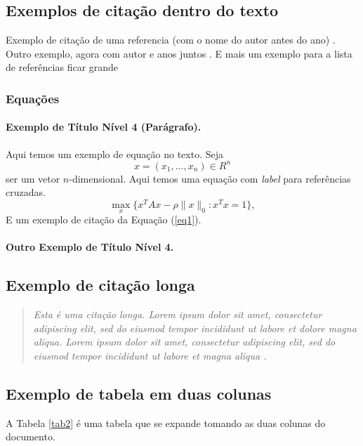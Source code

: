 \subsection{Exemplos de citação dentro do texto}
Exemplo de citação de uma referencia (com o nome do autor antes do ano) \cite{ref3}. Outro exemplo, agora com autor e anos juntos \citep{ref4}. E mais um exemplo para a lista de referências ficar grande \citep{ref2,ref3,ref4}


\subsubsection{Equações}
\paragraph{Exemplo de Título Nível 4 (Parágrafo).}
Aqui temos um exemplo de equação no texto. Seja
\[
x=(x_1,\dots,x_n)\in R^n
\] ser um vetor \(n\)-dimensional. Aqui temos uma equação com \textit{label} para referências cruzadas.
\begin{equation}\label{eq1}
\max\limits_{x}\{x^TAx-\rho\|x\|_0:x^Tx=1\},
\end{equation}
E um exemplo de citação da Equação (\ref{eq1}). 

\paragraph{Outro Exemplo de Título Nível 4.} \lipsum[1]

\subsection{Exemplo de citação longa}
\begin{quotation}
\textit{Esta é uma citação longa. Lorem ipsum dolor sit amet, consectetur adipiscing elit, sed do eiusmod tempor incididunt ut labore et dolore magna aliqua. Lorem ipsum dolor sit amet, consectetur adipiscing elit, sed do eiusmod tempor incididunt ut labore et magna aliqua \citep{ref5}.
}\end{quotation} 



\subsection{Exemplo de tabela em duas colunas}

A Tabela \ref{tab2} é uma tabela que se expande tomando as duas colunas do documento. 

